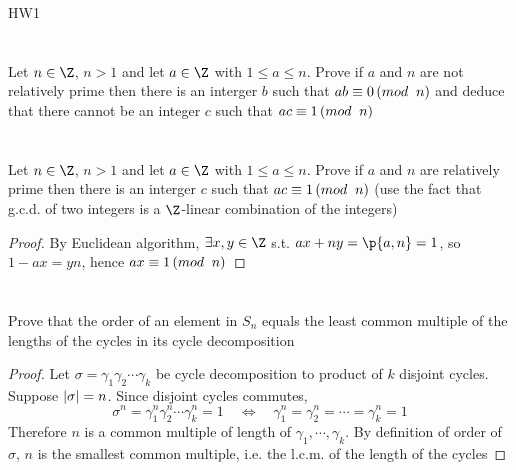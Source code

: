 \documentclass[11pt]{article}
\begin{document}
\begin{center}
    {\Huge HW1}
\end{center}


\section*{} Let $n\in \Z$, $n>1$ and let $a\in\Z$ with $1\leq a \leq n$. Prove if $a$ and $n$ are not relatively prime then there is an interger $b$ such that $ab \equiv 0 \left(mod \;\; n \right)$ and deduce that there cannot be an integer $c$ such that $ac \equiv 1 \left(mod \;\; n \right)$


\section*{} Let $n\in \Z$, $n>1$ and let $a\in\Z$ with $1\leq a \leq n$. Prove if $a$ and $n$ are relatively prime then there is an interger $c$ such that $ac \equiv 1 \left(mod \;\; n \right)$ (use the fact that g.c.d. of two integers is a $\Z$-linear combination of the integers)

\begin{proof}
    By Euclidean algorithm, $\exists x,y\in\Z$ s.t. $ax + ny = \p{a, n} = 1$, so $1 - ax = yn$, hence $ax \equiv 1 \left(mod \;\; n \right)$
\end{proof}


\section*{} Prove that the order of an element in $S_n$ equals the least common multiple of the lengths of the cycles in its cycle decomposition

\begin{proof}
    Let $\sigma = \gamma_1 \gamma_2 \cdots \gamma_k$ be cycle decomposition to product of $k$ disjoint cycles. Suppose $\left|\sigma\right|=n$. Since disjoint cycles commutes,
    \[
        \sigma^n = \gamma_1^n \gamma_2^n \cdots \gamma_k^n = 1
        \quad \iff \quad
        \gamma_1^n = \gamma_2^n = \cdots = \gamma_k^n = 1
    \]
    Therefore $n$ is a common multiple of length of $\gamma_1,\cdots, \gamma_k$. By definition of order of $\sigma$, $n$ is the smallest common multiple, i.e. the l.c.m. of the length of the cycles
\end{proof}
\end{document}
